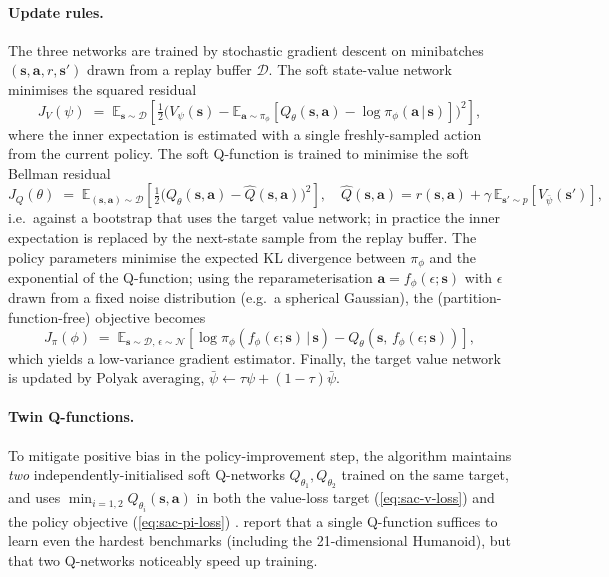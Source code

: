 \documentclass{article}
\begin{document}
\paragraph{Update rules.}
The three networks are trained by stochastic gradient descent on minibatches $(\mathbf{s},\mathbf{a},r,\mathbf{s}')$ drawn from a replay buffer $\mathcal{D}$. The soft state-value network minimises the squared residual
\begin{equation}
    J_V(\psi) \;=\; \mathbb{E}_{\mathbf{s}\sim\mathcal{D}}
    \!\left[\tfrac{1}{2}\big(V_\psi(\mathbf{s}) -
        \mathbb{E}_{\mathbf{a}\sim\pi_\phi}\!\left[Q_\theta(\mathbf{s},\mathbf{a}) - \log \pi_\phi(\mathbf{a}\,|\,\mathbf{s})\right]\big)^2\right],
    \label{eq:sac-v-loss}
\end{equation}
where the inner expectation is estimated with a single freshly-sampled action from the current policy. The soft Q-function is trained to minimise the soft Bellman residual
\begin{equation}
    J_Q(\theta) \;=\; \mathbb{E}_{(\mathbf{s},\mathbf{a})\sim\mathcal{D}}
    \!\left[\tfrac{1}{2}\big(Q_\theta(\mathbf{s},\mathbf{a}) - \hat Q(\mathbf{s},\mathbf{a})\big)^2\right],
    \quad
    \hat Q(\mathbf{s},\mathbf{a}) = r(\mathbf{s},\mathbf{a}) + \gamma\, \mathbb{E}_{\mathbf{s}'\sim p}\!\left[V_{\bar\psi}(\mathbf{s}')\right],
    \label{eq:sac-q-loss}
\end{equation}
i.e.\ against a bootstrap that uses the target value network; in practice the inner expectation is replaced by the next-state sample from the replay buffer. The policy parameters minimise the expected KL divergence between $\pi_\phi$ and the exponential of the Q-function; using the reparameterisation $\mathbf{a} = f_\phi(\epsilon;\mathbf{s})$ with $\epsilon$ drawn from a fixed noise distribution (e.g.\ a spherical Gaussian), the (partition-function-free) objective becomes
\begin{equation}
    J_\pi(\phi) \;=\; \mathbb{E}_{\mathbf{s}\sim\mathcal{D},\,\epsilon\sim\mathcal{N}}
    \!\left[\log \pi_\phi\!\left(f_\phi(\epsilon;\mathbf{s})\,|\,\mathbf{s}\right) -
        Q_\theta\!\left(\mathbf{s},\,f_\phi(\epsilon;\mathbf{s})\right)\right],
    \label{eq:sac-pi-loss}
\end{equation}
which yields a low-variance gradient estimator. Finally, the target value network is updated by Polyak averaging, $\bar\psi \leftarrow \tau \psi + (1-\tau)\bar\psi$.

\paragraph{Twin Q-functions.}
To mitigate positive bias in the policy-improvement step, the algorithm maintains \emph{two} independently-initialised soft Q-networks $Q_{\theta_1}, Q_{\theta_2}$ trained on the same target, and uses $\min_{i=1,2} Q_{\theta_i}(\mathbf{s},\mathbf{a})$ in both the value-loss target (\ref{eq:sac-v-loss}) and the policy objective (\ref{eq:sac-pi-loss}) \citep{fujimoto2018addressing}. \citet{haarnoja2018soft} report that a single Q-function suffices to learn even the hardest benchmarks (including the 21-dimensional Humanoid), but that two Q-networks noticeably speed up training.
\end{document}
